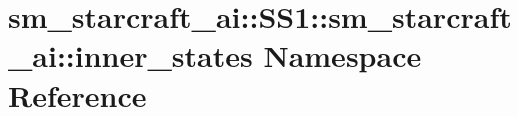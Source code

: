 \hypertarget{namespacesm__starcraft__ai_1_1SS1_1_1sm__starcraft__ai_1_1inner__states}{}\section{sm\+\_\+starcraft\+\_\+ai\+:\+:S\+S1\+:\+:sm\+\_\+starcraft\+\_\+ai\+:\+:inner\+\_\+states Namespace Reference}
\label{namespacesm__starcraft__ai_1_1SS1_1_1sm__starcraft__ai_1_1inner__states}
